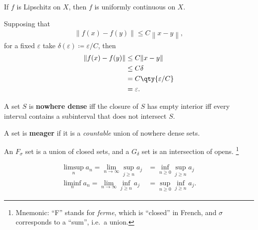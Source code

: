 \begin{proposition}

If \(f\) is Lipschitz on \(X\), then \(f\) is uniformly continuous on
\(X\).

Supposing that
\begin{align*}
{\left\lVert {f(x) - f(y)} \right\rVert} \leq C {\left\lVert {x-y} \right\rVert}
,\end{align*}
for a fixed \({\varepsilon}\) take
\(\delta({\varepsilon}) \coloneqq{\varepsilon}/C\), then
\begin{align*}
{\left\lVert {f(x) - f(y)} \right\rVert}
&\leq C {\left\lVert {x-y} \right\rVert} \\
&\leq C \delta \\
&= C \qty{{\varepsilon}/C} \\
&= {\varepsilon}
.\end{align*}

\end{proposition}

\begin{definition}

A set \(S\) is \textbf{nowhere dense} iff the closure of \(S\) has empty
interior iff every interval contains a subinterval that does not
intersect \(S\).

\end{definition}

\begin{definition}

A set is \textbf{meager} if it is a \emph{countable} union of nowhere
dense sets.

\end{definition}

\begin{definition}

An \(F_\sigma\) set is a union of closed sets, and a \(G_\delta\) set is
an intersection of opens. \footnote{Mnemonic: ``F'' stands for
  \emph{ferme}, which is ``closed'' in French, and \(\sigma\)
  corresponds to a ``sum'', i.e.~a union.}

\end{definition}

\begin{definition}

\begin{align*}  
\limsup_n a_n = \lim_{n\to \infty} \sup_{j\geq n} a_j &= \inf_{n\geq 0} \sup_{j\geq n} a_j \\ 
\liminf_n a_n = \lim_{n\to \infty} \inf_{j\geq n} a_j &= \sup_{n\geq 0} \inf_{j\geq n} a_j
.\end{align*}

\end{definition}

